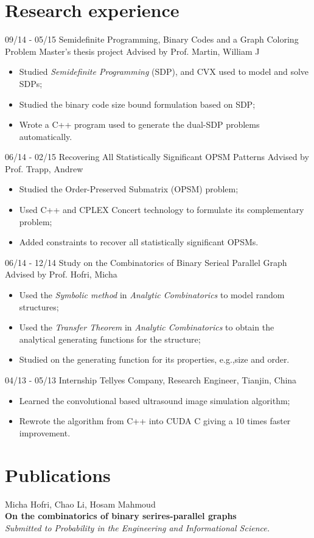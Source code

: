 \documentclass[]{friggeri-cv}
\begin{document}
\section{Research experience}
\begin{entrylist}
	\entry
	{09/14 - 05/15}
	{Semidefinite Programming, Binary Codes and a Graph Coloring Problem}
	{Master's thesis project Advised by Prof. Martin, William J}
	{
		\vspace{-3mm}
		\begin{itemize}
			\item Studied {\em Semidefinite Programming} (SDP), and CVX used to model
				and solve SDPs;
			\item Studied the binary code size bound formulation based on SDP;
			\item Wrote a C++ program used to generate the dual-SDP problems
				automatically.\\
		\end{itemize}
	}
	\entry
	{06/14 - 02/15}
	{Recovering All Statistically Significant OPSM Patterns}
	{Advised by Prof. Trapp, Andrew}
	{
		\vspace{-3mm}
		\begin{itemize}
			\item Studied the Order-Preserved Submatrix (OPSM) problem;
			\item Used C++ and CPLEX Concert technology to formulate its complementary problem;
			\item Added constraints to recover all statistically significant OPSMs.\\
		\end{itemize}
	}
	\entry
	{06/14 - 12/14}
	{Study on the Combinatorics of Binary Serieal Parallel Graph}
	{Advised by Prof. Hofri, Micha}
	{
		\vspace{-3mm}
		\begin{itemize}
			\item Used the \emph{Symbolic method} in {\em Analytic Combinatorics} to
				model random structures;
			\item Used the \emph{Transfer Theorem} in {\em Analytic Combinatorics} to
				obtain the analytical generating functions for the structure;
			\item Studied on the generating function for its properties, e.g.,size and
				order.\\
		\end{itemize}
	}
\end{entrylist}
\begin{entrylist}
	\entry
	{04/13 - 05/13}
	{Internship}
	{Tellyes Company, Research Engineer, Tianjin, China}
	{
		\vspace{-3mm}
		\begin{itemize}
			\item Learned the convolutional based ultrasound image simulation
				algorithm;
			\item Rewrote the algorithm from C++ into CUDA C giving a 10 times faster
				improvement.
		\end{itemize}
	}
\end{entrylist}
\section{Publications}
Micha Hofri, Chao Li, Hosam Mahmoud\\
\textbf{On the combinatorics of binary serires-parallel graphs}\\
\emph{Submitted to Probability in the Engineering and Informational Science.}
\end{document}
